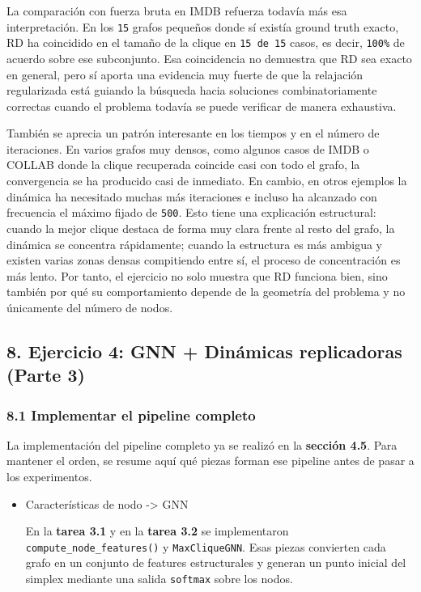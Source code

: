 \documentclass[11pt]{article}
\begin{document}
La comparación con fuerza bruta en IMDB refuerza todavía más esa
interpretación. En los \texttt{15} grafos pequeños donde sí existía
ground truth exacto, RD ha coincidido en el tamaño de la clique en
\texttt{15\ de\ 15} casos, es decir, \texttt{100\%} de acuerdo sobre ese
subconjunto. Esa coincidencia no demuestra que RD sea exacto en general,
pero sí aporta una evidencia muy fuerte de que la relajación
regularizada está guiando la búsqueda hacia soluciones combinatoriamente
correctas cuando el problema todavía se puede verificar de manera
exhaustiva.

También se aprecia un patrón interesante en los tiempos y en el número
de iteraciones. En varios grafos muy densos, como algunos casos de IMDB
o COLLAB donde la clique recuperada coincide casi con todo el grafo, la
convergencia se ha producido casi de inmediato. En cambio, en otros
ejemplos la dinámica ha necesitado muchas más iteraciones e incluso ha
alcanzado con frecuencia el máximo fijado de \texttt{500}. Esto tiene
una explicación estructural: cuando la mejor clique destaca de forma muy
clara frente al resto del grafo, la dinámica se concentra rápidamente;
cuando la estructura es más ambigua y existen varias zonas densas
compitiendo entre sí, el proceso de concentración es más lento. Por
tanto, el ejercicio no solo muestra que RD funciona bien, sino también
por qué su comportamiento depende de la geometría del problema y no
únicamente del número de nodos.

    \subsection{8. Ejercicio 4: GNN + Dinámicas replicadoras (Parte
3)}\label{ejercicio-4-gnn-dinuxe1micas-replicadoras-parte-3}

    \subsubsection{8.1 Implementar el pipeline
completo}\label{implementar-el-pipeline-completo}

La implementación del pipeline completo ya se realizó en la
\textbf{sección 4.5}. Para mantener el orden, se resume aquí qué piezas
forman ese pipeline antes de pasar a los experimentos.

    \begin{itemize}
\item
  Características de nodo -\textgreater{} GNN

  En la \textbf{tarea 3.1} y en la \textbf{tarea 3.2} se implementaron
  \texttt{compute\_node\_features()} y \texttt{MaxCliqueGNN}. Esas
  piezas convierten cada grafo en un conjunto de features estructurales
  y generan un punto inicial del simplex mediante una salida
  \texttt{softmax} sobre los nodos.
\end{itemize}
\end{document}
